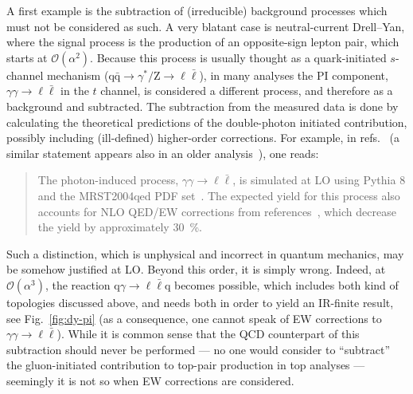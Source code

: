 A first example is the subtraction of (irreducible) background processes which must not be considered as such. A very blatant case
is neutral-current Drell--Yan, where the signal process is the production of an opposite-sign lepton pair, which starts
at $\mathcal O(\alpha^2)$. Because this process is usually thought
as a quark-initiated $s$-channel mechanism ($\mathrm{q} \bar{\mathrm{q}} \to \gamma^*/\mathrm{Z} \to \ell \bar{\ell}$), in many analyses the PI component,
$\gamma \gamma \to \ell \bar{\ell}$ in the $t$ channel, is considered a different process, and therefore as a background and subtracted.
The subtraction from the measured data is done by calculating the theoretical predictions of the double-photon initiated contribution, possibly including (ill-defined) higher-order
corrections. For example, in refs.~\cite{Aaboud:2017ffb,Aad:2016zzw} (a similar statement appears also in an older analysis~\cite{Aad:2013iua}), one reads:
\begin{quote}
The photon-induced process, $\gamma\gamma \to \ell \bar{\ell}$, is simulated at LO using Pythia 8
and the MRST2004qed PDF set~\cite{Martin:2004dh}. The expected yield for this process also accounts for 
NLO QED/EW corrections from references~\cite{Bardin:2012jk,Bondarenko:2013nu}, which decrease the yield by approximately \SI{30}{\percent}.
\end{quote}
Such a distinction, which is unphysical and incorrect in quantum mechanics, may be somehow justified at LO. Beyond this order, it is simply wrong.
Indeed, at $\mathcal O(\alpha^3)$, the reaction $\mathrm{q} \gamma \to \ell \bar{\ell} \mathrm{q}$ becomes possible, which
includes both kind of topologies discussed above, and needs both in order to yield an IR-finite result, see Fig.~\ref{fig:dy-pi} (as a consequence, one cannot speak of EW corrections to $\gamma \gamma \to \ell \bar{\ell}$). While it is common sense that the QCD counterpart of this subtraction should never 
be performed --- no one would
consider to \enquote{subtract} the gluon-initiated contribution to top-pair production in top analyses --- seemingly it is not so
when EW corrections are considered.

